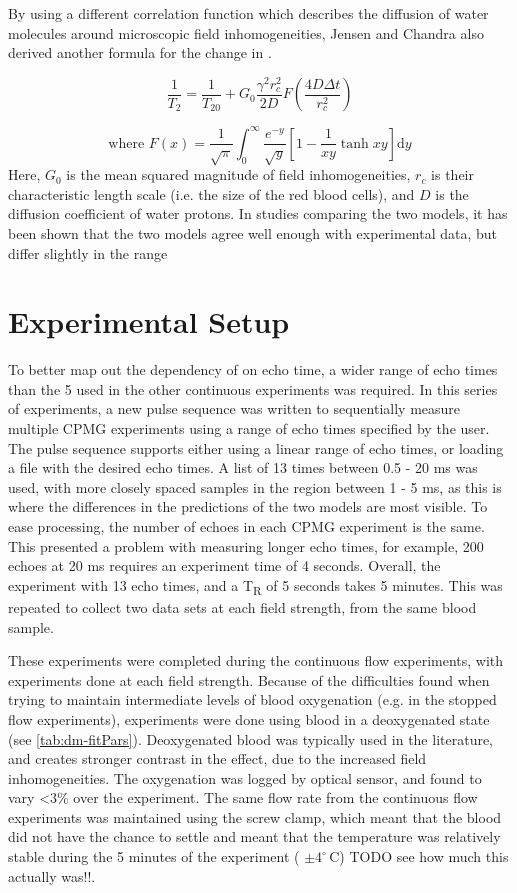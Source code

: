 By using a different correlation function which describes the diffusion of water molecules around microscopic field inhomogeneities, Jensen and Chandra also derived another formula for the change in \Ttwo.

\begin{equation}
\label{eq:JC}
\frac{1}{T_2} = \frac{1}{T_{20}}+ G_0 \frac{\gamma^2 r_c^2}{2D} F(\frac{4D \Delta t}{r_c^2})
\end{equation}

\begin{displaymath}
\mbox{where  } F(x) = \frac{1}{\sqrt{\pi}} \int_0^\infty \frac{e^{-y}}{\sqrt{y}} \left[1-\frac{1}{xy} \tanh{xy}\right] \mathrm{d}y
\end{displaymath}
Here, $G_0$ is the mean squared magnitude of field inhomogeneities, $r_c$ is their characteristic length scale (i.e. the size of the red blood cells), and $D$ is the diffusion coefficient of water protons.
In studies comparing the two models, it has been shown that the two models agree well enough with experimental data, but differ slightly in the range

\section{Experimental Setup}
To better map out the dependency of \Ttwo on echo time, a wider range of echo times than the 5 used in the other continuous experiments was required.
In this series of experiments, a new pulse sequence  was written to sequentially measure multiple CPMG experiments using a range of echo times specified by the user.
The pulse sequence supports either using a linear range of echo times, or loading a file with the desired echo times.
A list of 13 times between 0.5 - 20 ms was used, with more closely spaced samples in the region between 1 - 5 ms, as this is where the differences in the predictions of the two models are most visible.
To ease processing, the number of echoes in each CPMG experiment is the same.
This presented a problem with measuring longer echo times, for example, 200 echoes at 20 ms requires an experiment time of 4 seconds.
Overall, the experiment with 13 echo times, and a T\textsubscript{R} of 5 seconds takes 5 minutes.
This was repeated to collect two data sets at each field strength, from the same blood sample.

These experiments were completed during the continuous flow experiments, with experiments done at each field strength.
Because of the difficulties found when trying to maintain intermediate levels of blood oxygenation (e.g. in the stopped flow experiments), experiments were done using blood in a deoxygenated state (see \autoref{tab:dm-fitPars}).
Deoxygenated blood was typically used in the literature, and creates stronger contrast in the \Ttwo effect, due to the increased field inhomogeneities.
The oxygenation was logged by optical sensor, and found to vary <3\% over the experiment.
The same flow rate from the continuous flow experiments was maintained using the screw clamp, which meant that the blood did not have the chance to settle and meant that the temperature was relatively stable during the 5 minutes of the experiment ( \mbox{$\pm 4^{\circ}\, \mathrm{C}$}) TODO see how much this actually was!!.

